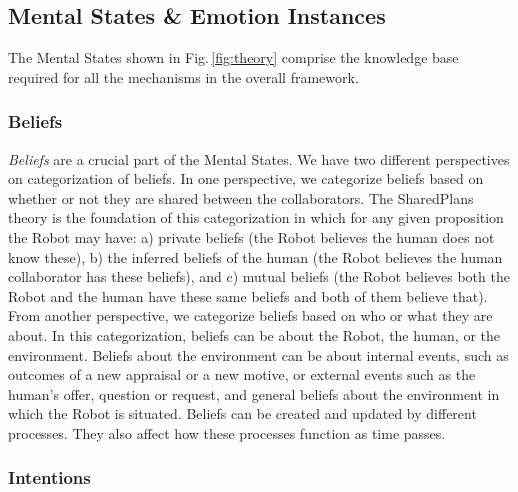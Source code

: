 \subsection{Mental States \& Emotion Instances}

The Mental States shown in Fig.\,\ref{fig:theory} comprise the knowledge base
required for all the mechanisms in the overall framework.

\subsubsection{Beliefs}
\label{sec:beliefs}

\textit{Beliefs} are a crucial part of the Mental States. We have two different
perspectives on categorization of beliefs. In one perspective, we categorize
beliefs based on whether or not they are shared between the collaborators. The
SharedPlans \cite{grosz:plans-discourse} theory is the foundation of this
categorization in which for any given proposition the Robot may have: a) private
beliefs (the Robot believes the human does not know these), b) the inferred
beliefs of the human (the Robot believes the human collaborator has these
beliefs), and c) mutual beliefs (the Robot believes both the Robot and the human
have these same beliefs and both of them believe that). From another
perspective, we categorize beliefs based on who or what they are about. In this
categorization, beliefs can be about the Robot, the human, or the environment.
Beliefs about the environment can be about internal events, such as outcomes of
a new appraisal or a new motive, or external events such as the human's offer,
question or request, and general beliefs about the environment in which the
Robot is situated. Beliefs can be created and updated by different processes.
They also affect how these processes function as time passes.

\subsubsection{Intentions}
\label{sec:intentions}

